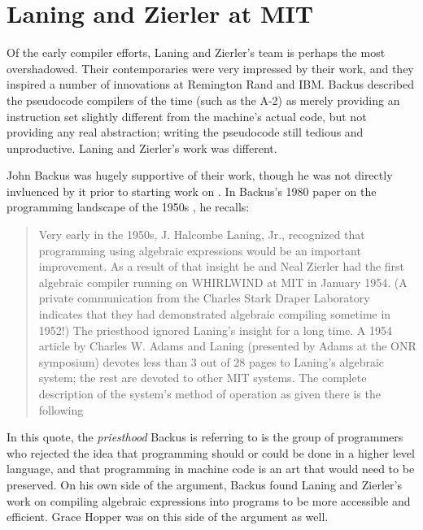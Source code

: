 

\section{Laning and Zierler at MIT}
\label{sec:laning-zierler}

Of the early compiler efforts, Laning and Zierler's team is perhaps the most overshadowed.
Their contemporaries were very impressed by their work, and they inspired a number
of innovations at Remington Rand and IBM.
Backus described the pseudocode compilers of the time (such as the A-2)
as merely providing an instruction set
slightly different from the machine's actual code, but not providing any real abstraction;
writing the pseudocode still tedious and unproductive.
Laning and Zierler's work was different.

John Backus was hugely supportive of their work, though he was not directly invluenced by it
prior to starting work on .
In Backus's 1980 paper on the programming landscape of the 1950s
, he recalls:

\begin{quotation}
	Very early in the 1950s, J. Halcombe Laning, Jr., recognized that
	programming using algebraic expressions would be an important improvement.
	As a result of that insight he and Neal Zierler had the first
	algebraic compiler running on WHIRLWIND at MIT in January 1954.
	(A private communication from the Charles Stark Draper Laboratory indicates
	that they had demonstrated algebraic compiling sometime in 1952!) The priesthood
	ignored Laning's insight for a long time. A 1954 article by Charles W. Adams
	and Laning (presented by Adams at the ONR symposium) devotes less than
	3 out of 28 pages to Laning's algebraic system; the rest are devoted to other
	MIT systems. The complete description of the system's method of operation
	as given there is the following
\end{quotation}

In this quote, the \textit{priesthood} Backus is referring to is the group of programmers
who rejected the idea that programming should or could be done in a higher level language,
and that programming in machine code is an art that would need to be preserved.
On his own side of the argument, Backus found Laning and Zierler's work on compiling
algebraic expressions into programs to be more accessible and efficient.
Grace Hopper was on this side of the argument as well.

